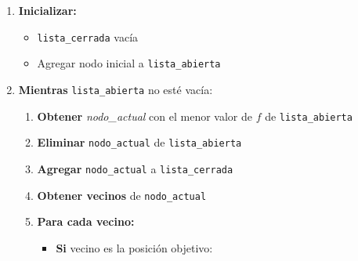\begin{enumerate}
    \item \textbf{Inicializar:}
        \begin{itemize}
            \item \texttt{lista\_cerrada} vacía
            \item Agregar nodo inicial a \texttt{lista\_abierta}
        \end{itemize}
        
    \item \textbf{Mientras} \texttt{lista\_abierta} no esté vacía:
        \begin{enumerate}
            \item \textbf{Obtener} \textit{nodo\_actual} con el menor valor de $f$ de \texttt{lista\_abierta}
            \item \textbf{Eliminar} \texttt{nodo\_actual} de \texttt{lista\_abierta}
            \item \textbf{Agregar} \texttt{nodo\_actual} a \texttt{lista\_cerrada}
            \item \textbf{Obtener vecinos} de \texttt{nodo\_actual}
            \item \textbf{Para cada vecino:}
                \begin{itemize}
                    \item \textbf{Si} vecino es la posición objetivo:
                    

\end{itemize}
\end{enumerate}
\end{enumerate}
